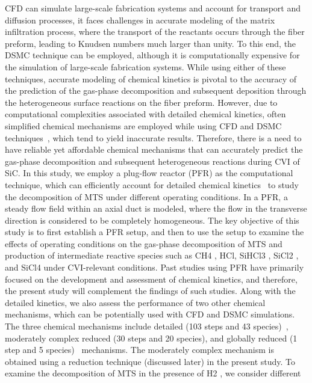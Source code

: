 \documentclass[final, letterpaper, square, comma, numbers, sort&compress]{elsarticle}
\begin{document}
CFD can simulate large-scale fabrication systems and account for transport and diffusion processes, it faces
challenges in accurate modeling of the matrix infiltration process, where the transport of the reactants
occurs through the fiber preform, leading to Knudsen numbers much larger than unity. To this end, the
DSMC technique can be employed, although it is computationally expensive for the simulation of large-scale
fabrication systems. While using either of these techniques, accurate modeling of chemical kinetics is pivotal
to the accuracy of the prediction of the gas-phase decomposition and subsequent deposition through the
heterogeneous surface reactions on the fiber preform. However, due to computational complexities associated
with detailed chemical kinetics, often simplified chemical mechanisms are employed while using CFD and
DSMC techniques~\cite{Deck2012,Mollick2017,Ogawa2023}, which tend to yield inaccurate results. Therefore, there is a need to have
reliable yet affordable chemical mechanisms that can accurately predict the gas-phase decomposition and
subsequent heterogeneous reactions during CVI of SiC. In this study, we employ a plug-flow reactor (PFR)
as the computational technique, which can efficiently account for detailed chemical kinetics~\cite{Papasouliotis1994,Roman1995,Bammidipati1996,Norinaga2008} to study
the decomposition of MTS under different operating conditions. In a PFR, a steady flow field within an axial
duct is modeled, where the flow in the transverse direction is considered to be completely homogeneous.
The key objective of this study is to first establish a PFR setup, and then to use the setup to examine
the effects of operating conditions on the gas-phase decomposition of MTS and production of intermediate
reactive species such as CH4 , HCl, SiHCl3 , SiCl2 , and SiCl4 under CVI-relevant conditions. Past studies
using PFR have primarily focused on the development and assessment of chemical kinetics, and therefore,
the present study will complement the findings of such studies. Along with the detailed kinetics, we also
assess the performance of two other chemical mechanisms, which can be potentially used with CFD and
DSMC simulations. The three chemical mechanisms include detailed (103 steps and 43 species)~\cite{Ge2007A,Ge2007B,Ge2010},
moderately complex reduced (30 steps and 20 species), and globally reduced (1 step and 5 species)~\cite{Mousavipour2004}
mechanisms. The moderately complex mechanism is obtained using a reduction technique (discussed later)
in the present study. To examine the decomposition of MTS in the presence of H2 , we consider different
\end{document}
